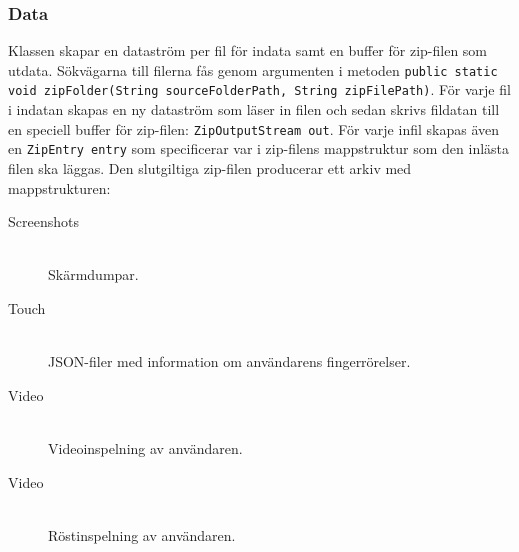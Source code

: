 \subsubsection{Data}
Klassen skapar en dataström per fil för indata samt en buffer för zip-filen som utdata. Sökvägarna till filerna fås genom argumenten i metoden \verb:public static  void zipFolder(String sourceFolderPath, String zipFilePath):. För varje fil i indatan skapas en ny dataström som läser in filen och sedan skrivs fildatan till en speciell buffer för zip-filen: \verb:ZipOutputStream out:. För varje infil skapas även en \verb:ZipEntry entry: som specificerar var i zip-filens mappstruktur som den inlästa filen ska läggas. Den slutgiltiga zip-filen producerar ett arkiv med mappstrukturen:
\begin{description}
  \item[Screenshots] \hfill \\
  	Skärmdumpar.
  \item[Touch] \hfill \\
  	JSON-filer med information om användarens fingerrörelser.
  \item[Video] \hfill \\
  	Videoinspelning av användaren.
  \item[Video] \hfill \\
  	Röstinspelning av användaren.
\end{description}